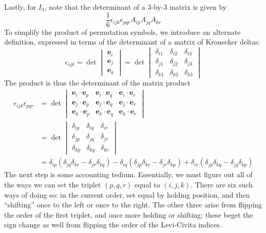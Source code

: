 \documentclass[a4paper]{article}
\begin{document}
Lastly, for \( I_{3} \), note that the determinant of a 3-by-3 matrix is given by
\[
	\frac{1}{6}\epsilon_{ijk}\epsilon_{pqr}A_{ip}A_{jq}A_{kr} 
\]
To simplify the product of permutation symbols, we introduce an alternate definition, expressed in terms of the determinant of a matrix of Kronecker deltas:
\[
	\epsilon_{ijk} = \det \begin{vmatrix}
		\pmb{e}_{i} \\
		\pmb{e}_{j} \\
		\pmb{e}_{k} 
	\end{vmatrix} =
	\det \begin{vmatrix}
		\delta_{i1} & \delta_{i2} & \delta_{i3} \\
		\delta_{j1} & \delta_{j2} & \delta_{j3} \\
		\delta_{k1} & \delta_{k2} & \delta_{k3}
	\end{vmatrix}
\]
The product is thus the determinant of the matrix product
\begin{align*}
	\epsilon_{ijk}\epsilon_{pqr} & = \det \begin{vmatrix}
		\pmb{e}_{i} \cdot \pmb{e}_{p} & \pmb{e}_{i} \cdot \pmb{e}_{q} & \pmb{e}_{i} \cdot \pmb{e}_{r} \\
		\pmb{e}_{j} \cdot \pmb{e}_{p} & \pmb{e}_{j} \cdot \pmb{e}_{q} & \pmb{e}_{j} \cdot \pmb{e}_{r} \\
		\pmb{e}_{k} \cdot \pmb{e}_{p} & \pmb{e}_{k} \cdot \pmb{e}_{q} & \pmb{e}_{k} \cdot \pmb{e}_{r}
	\end{vmatrix} \\
				     & =
	\det \begin{vmatrix}
		\delta_{ip} & \delta_{iq} & \delta_{ir} \\
		\delta_{jp} & \delta_{jq} & \delta_{jr} \\
		\delta_{kp} & \delta_{kq} & \delta_{kr}
	\end{vmatrix} \\
				     & = \delta_{ip}\!\left( \delta_{jq}\delta_{kr} - \delta_{jr}\delta_{kq} \right) - \delta_{iq}\!\left( \delta_{jp}\delta_{kr} - \delta_{jr}\delta_{kp}\right) + \delta_{ir}\!\left( \delta_{jp}\delta_{kq} - \delta_{jq}\delta_{kp} \right)
\end{align*}
The next step is some accounting tedium. Essentially, we must figure out all of the ways we can set the triplet \( \!\left( p,q,r \right) \) equal to \( \!\left( i,j,k \right) \). There are six such ways of doing so: in the current order, set equal by holding position, and then ``shifting'' once to the left or once to the right. The other three arise from flipping the order of the first triplet, and once more holding or shifting; these beget the sign change as well from flipping the order of the Levi-Civita indices. 
\end{document}
